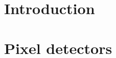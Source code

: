 \documentclass[a4paper]{report}
\begin{document}
\tableofcontents



\chapter{Introduction}


%

\chapter{Pixel detectors}


%

%

%



\printbibliography
\end{document}
